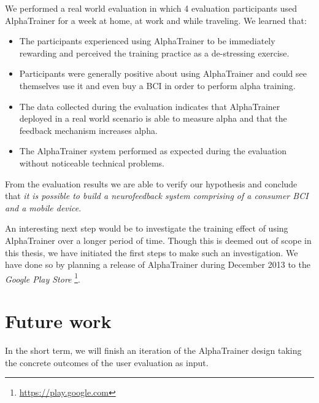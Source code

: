 \documentclass[a4paper,10pt,english,lof,lot,twoside]{puthesis}
\begin{document}
We performed a real world evaluation in which 4 evaluation participants used AlphaTrainer for a week at home, at work and while traveling. We learned that:
\begin{itemize}
\item {} 
The participants experienced using AlphaTrainer to be immediately rewarding and perceived the training practice as a de-stressing exercise.

\item {} 
Participants were generally positive about using AlphaTrainer and could see themselves use it and even buy a BCI in order to perform alpha training.

\item {} 
The data collected during the evaluation indicates that AlphaTrainer deployed in a real world scenario is able to measure alpha and that the feedback mechanism increases alpha.

\item {} 
The AlphaTrainer system performed as expected during the evaluation without noticeable technical problems.

\end{itemize}

From the evaluation results we are able to verify our hypothesis and conclude that \emph{it is possible to build a neurofeedback system comprising of a consumer BCI and a mobile device}.

An interesting next step would be to investigate the training effect of using AlphaTrainer over a longer period of time. Though this is deemed out of scope in this thesis, we have initiated the first steps to make such an investigation. We have done so by planning a release of AlphaTrainer during December 2013 to the \emph{Google Play Store} \footnote{
\href{https://play.google.com}{https://play.google.com}
}.


\section{Future work}
\label{ch-conclusion/index:future-work}\label{ch-conclusion/index:sec-future-work}
In the short term, we will finish an iteration of the AlphaTrainer design taking the concrete outcomes of the user evaluation as input.
\end{document}
